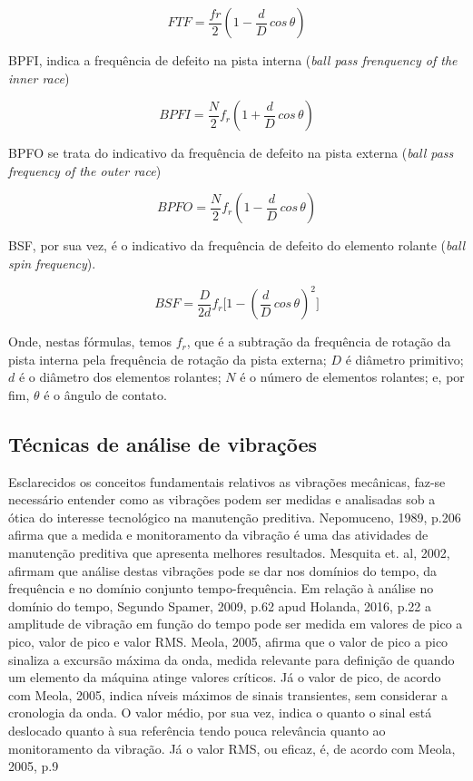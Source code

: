 \documentclass[
	12pt,				
	oneside,			
	a4paper,			
	english,			
	brazil				
	]{abntex2ppgsi}
\begin{document}
\[FTF = \frac{fr}{2} \left ( 1 - \frac{d}{D} \,cos \, \theta \right )  \]

BPFI, indica a frequência de defeito na pista interna (\textit{ball pass frenquency of the inner race})

\[BPFI = \frac{N}{2}f_{r} \left ( 1 + \frac{d}{D} \,cos \, \theta \right )  \]

BPFO se trata do indicativo da frequência de defeito na pista externa (\textit{ball pass frequency of the outer race})

\[BPFO = \frac{N}{2}f_{r} \left ( 1 - \frac{d}{D} \,cos \, \theta \right )  \]

BSF, por sua vez, é o indicativo da frequência de defeito do elemento rolante (\textit{ball spin frequency}).

\[BSF = \frac{D}{2d}f_{r} \Bigg[  1 - \left ( \frac{d}{D} \,cos \, \theta \right ) ^{2}  \Bigg] \]

Onde, nestas fórmulas, temos $f_{r}$, que é a subtração da frequência de rotação da pista interna pela frequência de rotação da pista externa; $D$ é diâmetro primitivo; $d$ é o diâmetro dos elementos rolantes; $N$ é o número de elementos rolantes; e, por fim, $\theta$ é o ângulo de contato.

\subsection{\textbf{Técnicas de análise de vibrações}}

Esclarecidos os conceitos  fundamentais relativos as vibrações mecânicas, faz-se necessário entender como as vibrações podem ser medidas e analisadas sob a ótica do interesse tecnológico na manutenção preditiva. Nepomuceno, 1989, p.206 afirma que a medida e monitoramento da vibração é uma das atividades de manutenção preditiva que apresenta melhores resultados. 
Mesquita et. al, 2002, afirmam que análise destas vibrações pode se dar nos domínios do tempo, da frequência e no domínio conjunto tempo-frequência.
Em relação à análise no domínio do tempo, Segundo Spamer, 2009, p.62 apud Holanda, 2016, p.22 a amplitude de vibração em função do tempo pode ser medida em valores de pico a pico, valor de pico e valor RMS. 
Meola, 2005, afirma que o valor de pico a pico sinaliza a excursão máxima da onda, medida relevante para definição de quando um elemento da máquina atinge valores críticos. 
Já o valor de pico, de acordo com Meola, 2005, indica níveis máximos de sinais transientes, sem considerar a cronologia da onda. 
O valor médio, por sua vez, indica o quanto o sinal está deslocado quanto à sua referência tendo pouca relevância quanto ao monitoramento da vibração. 
Já o valor RMS, ou eficaz, é, de acordo com Meola, 2005, p.9
\end{document}
